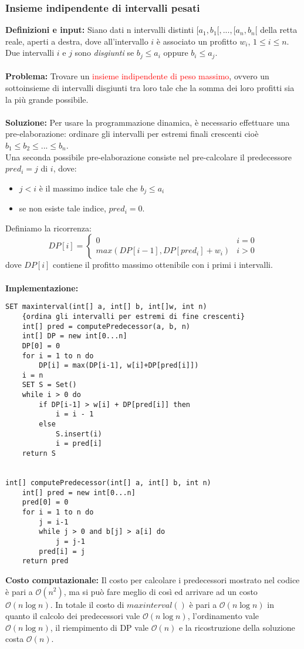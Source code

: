 \documentclass[../cheatSheetAlgoritmi.tex]{subfiles}
\begin{document}
\subsubsection{Insieme indipendente di intervalli pesati}
\textbf{Definizioni e input:} Siano dati n intervalli distinti $[a_1, b_1[, ..., [a_n,b_n[$ della retta reale, aperti a destra, dove all'intervallo $i$ è associato un profitto $w_{i}$, $1\leq i \leq n$. Due intervalli $i$ e $j$ sono \emph{disgiunti} se $b_j \leq a_i$ oppure $b_i \leq a_j.$\\\\
\textbf{Problema:} Trovare un \textcolor{red}{insieme indipendente di peso massimo}, ovvero un sottoinsieme di intervalli disgiunti tra loro tale che la somma dei loro profitti sia la più grande possibile.\\\\
\textbf{Soluzione:} Per usare la programmazione dinamica, è necessario effettuare una pre-elaborazione: ordinare gli intervalli per estremi finali crescenti cioè $b_1 \leq b_2 \leq ... \leq b_n$. \\
Una seconda possibile pre-elaborazione consiste nel pre-calcolare il predecessore $pred_{i} = j$ di $i$, dove: 
\begin{itemize}
	\item $j < i$ è il massimo indice tale che $b_j \leq a_i$
	\item se non esiste tale indice, $pred_{i} = 0$.
\end{itemize}
Definiamo la ricorrenza:
\begin{equation*}
  	DP[i] =\begin{cases}
    	0 & \text{$i = 0$}\\
    	max(DP[i-1], DP[pred_{i}] + w_{i})  & \text{$i > 0$}   	
  	\end{cases}
\end{equation*}
dove $DP[i]$ contiene il profitto massimo ottenibile con i primi i intervalli.\\\\
\newpage
\noindent
\textbf{Implementazione:}
\begin{lstlisting}[caption= Insieme indipendente di intervalli pesati]
SET maxinterval(int[] a, int[] b, int[]w, int n)
	{ordina gli intervalli per estremi di fine crescenti}
	int[] pred = computePredecessor(a, b, n)
	int[] DP = new int[0...n]
	DP[0] = 0
	for i = 1 to n do
		DP[i] = max(DP[i-1], w[i]+DP[pred[i]])
	i = n
	SET S = Set()
	while i > 0 do
		if DP[i-1] > w[i] + DP[pred[i]] then
			i = i - 1
		else
			S.insert(i)
			i = pred[i]
	return S

	
int[] computePredecessor(int[] a, int[] b, int n)
	int[] pred = new int[0...n]
	pred[0] = 0
	for i = 1 to n do
		j = i-1
		while j > 0 and b[j] > a[i] do
			j = j-1
		pred[i] = j
	return pred
\end{lstlisting}
\textbf{Costo computazionale:} Il costo per calcolare i predecessori mostrato nel codice è pari a $\mathcal{O}(n^{2})$, ma si può fare meglio di così ed arrivare ad un costo $\mathcal{O}(n \log n)$.
In totale il costo di $maxinterval()$ è pari a $\mathcal{O}(n \log n)$ in quanto il calcolo dei predecessori vale $\mathcal{O}(n \log n)$, l'ordinamento vale $\mathcal{O}(n \log n)$, il riempimento di DP vale $\mathcal{O}(n)$  e la ricostruzione della soluzione costa $\mathcal{O}(n)$.
\end{document}
